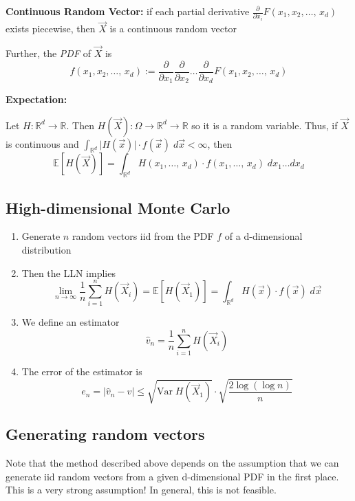\documentclass[12pt]{article}
\renewcommand{\hat}[1]{\widehat{#1}}
\newcommand{\R}{\mathbb{R}}
\newcommand{\E}{\mathbb{E}}
\newcommand{\Var}{\text{Var}\;}
\begin{document}
\textbf{Continuous Random Vector:} if each partial derivative $\frac{\partial}{\partial x_i} F(x_1, x_2, \dots,\, x_d)$ exists piecewise, then $\vec X$ is a continuous random vector 

Further, the \emph{PDF} of $\vec X$ is 
\[f(x_1, x_2, \dots,\, x_d) := \frac{\partial}{\partial x_1} \frac{\partial}{\partial x_2} \dots \frac{\partial}{\partial x_d} F(x_1, x_2, \dots,\, x_d)\]

\textbf{Expectation:}

Let $H : \R^d \to \R$. Then $H(\vec{X}): \Omega \to \R^d \to \R$ so it is a random variable. Thus, if $\vec X$ is continuous and $\int_{\R^d} \big\vert H(\vec x) \big \vert \cdot f(\vec x) \; d\vec x < \infty$, then 
\[\E[H(\vec X)] = \int_{\R^d} H(x_1, \dots,\, x_d) \cdot f(x_1, \dots, \, x_d)\; dx_1 \dots dx_d\]

\subsection{High-dimensional Monte Carlo}
\begin{enumerate}
    \item Generate $n$ random vectors iid from the PDF $f$ of a d-dimensional distribution 
    
    \item Then the LLN implies 
    \[\lim_{n\to \infty} \frac{1}{n} \sum_{i=1}^n H(\vec X_i) = \E[H(\vec X_1)] = \int_{\R^d} H(\vec x) \cdot f(\vec x) \; d\vec x\]

    \item We define an estimator 
    \[\hat v_n = \frac{1}{n} \sum_{i=1}^n H(\vec X_i)\]

    \item The error of the estimator is 
    \[e_n = \big\vert \hat v_n - v \big\vert \leq \sqrt{\Var H(\vec X_1)}\cdot \sqrt{\frac{2\log(\log n)}{n}}\]
\end{enumerate}

\subsection{Generating random vectors}
Note that the method described above depends on the assumption that we can generate iid random vectors from a given d-dimensional PDF in the first place. This is a very strong assumption! In general, this is not feasible. 
\end{document}
